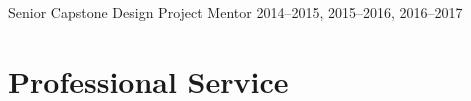 \begin{outerlist}
\item Senior Capstone Design Project Mentor \hfill 2014--2015, 2015--2016, 2016--2017


\end{outerlist}

\section{{\sectionfont Professional Service}}

